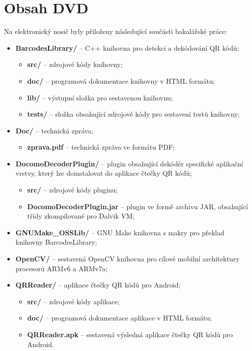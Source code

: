 \chapter{Obsah DVD}
\label{obsahDVD}

Na elektronický nosič byly přiloženy následující součásti bakalářské práce: 
\bigskip

\begin{itemize}
  \item \textbf{BarcodesLibrary/} -- C++ knihovna pro detekci a
  dekódování QR kódů;
  	\begin{itemize}
  	  \item \textbf{src/} -- zdrojové kódy knihovny;
  	  \item \textbf{doc/} -- programová dokumentace knihovny v HTML formátu;
  	  \item \textbf{lib/} -- výstupní složka pro sestavenou knihovnu;
  	  \item \textbf{tests/} -- složka obsahující zdrojové kódy pro sestavení
  	  testů knihovny;
	\end{itemize}
  \item \textbf{Doc/} -- technická zpráva;
  	\begin{itemize}
  	  \item \textbf{zprava.pdf} -- technická zpráva ve formátu PDF;
	\end{itemize}
  \item \textbf{DocomoDecoderPlugin/} -- plugin obsahující dekódér
  specifické aplikační vrstvy, který lze doinstalovat do aplikace čtečky QR
  kódů;
  	\begin{itemize}
  	  \item \textbf{src/} -- zdrojové kódy pluginu;
  	  \item \textbf{DocomoDecoderPlugin.jar} -- plugin ve formě archivu JAR,
  	  obsahující třídy zkompilované pro Dalvik VM;
	\end{itemize}
  \item \textbf{GNUMake\_OSSLib/} -- GNU Make knihovna s makry pro překlad
  knihovny \linebreak[5]BarcodesLibrary;
  \item \textbf{OpenCV/} -- sestavená OpenCV knihovna pro cílové mobilní
  architektury procesorů ARMv6 a ARMv7a;
  \item \textbf{QRReader/} -- aplikace čtečky QR kódů pro Android;
  	\begin{itemize}
  	  \item \textbf{src/} -- zdrojové kódy aplikace;
  	  \item \textbf{doc/} -- programová dokumentace aplikace v HTML formátu;
  	  \item \textbf{QRReader.apk} -- sestavená výsledná aplikace čtečky QR
  	  kódů pro Android.
	\end{itemize}
\end{itemize}

